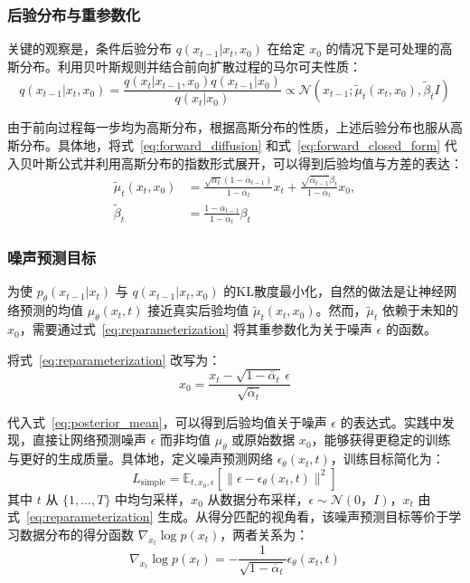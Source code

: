 \subsubsection{后验分布与重参数化}

关键的观察是，条件后验分布 $q(x_{t-1}|x_t,x_0)$ 在给定 $x_0$ 的情况下是可处理的高斯分布。利用贝叶斯规则并结合前向扩散过程的马尔可夫性质：
\begin{equation}\label{eq:posterior}
      q(x_{t-1}|x_t,x_0) = \frac{q(x_t|x_{t-1},x_0)q(x_{t-1}|x_0)}{q(x_t|x_0)} \propto \mathcal{N}(x_{t-1}; \tilde{\mu}_t(x_t,x_0), \tilde{\beta}_t I)
\end{equation}

由于前向过程每一步均为高斯分布，根据高斯分布的性质，上述后验分布也服从高斯分布。具体地，将式~\eqref{eq:forward_diffusion} 和式~\eqref{eq:forward_closed_form} 代入贝叶斯公式并利用高斯分布的指数形式展开，可以得到后验均值与方差的表达：
\begin{align}
      \tilde{\mu}_t(x_t,x_0) &= \frac{\sqrt{\alpha_t}(1-\overline{\alpha}_{t-1})}{1-\overline{\alpha}_t}x_t + \frac{\sqrt{\overline{\alpha}_{t-1}}\beta_t}{1-\overline{\alpha}_t}x_0, \label{eq:posterior_mean}\\
      \tilde{\beta}_t &= \frac{1-\overline{\alpha}_{t-1}}{1-\overline{\alpha}_t}\beta_t \label{eq:posterior_var}
\end{align}

\subsubsection{噪声预测目标}

为使 $p_\theta(x_{t-1}|x_t)$ 与 $q(x_{t-1}|x_t,x_0)$ 的KL散度最小化，自然的做法是让神经网络预测的均值 $\mu_\theta(x_t,t)$ 接近真实后验均值 $\tilde{\mu}_t(x_t,x_0)$。然而，$\tilde{\mu}_t$ 依赖于未知的 $x_0$，需要通过式~\eqref{eq:reparameterization} 将其重参数化为关于噪声 $\epsilon$ 的函数。

将式~\eqref{eq:reparameterization} 改写为：
\begin{equation}\label{eq:x0_from_xt}
      x_0 = \frac{x_t - \sqrt{1-\overline{\alpha}_t}\,\epsilon}{\sqrt{\overline{\alpha}_t}}
\end{equation}

代入式~\eqref{eq:posterior_mean}，可以得到后验均值关于噪声 $\epsilon$ 的表达式。实践中发现，直接让网络预测噪声 $\epsilon$ 而非均值 $\mu_\theta$ 或原始数据 $x_0$，能够获得更稳定的训练与更好的生成质量。具体地，定义噪声预测网络 $\epsilon_\theta(x_t,t)$，训练目标简化为：
\begin{equation}\label{eq:noise_loss}
      L_{\text{simple}} = \mathbb{E}_{t,x_0,\epsilon}\left[\|\epsilon - \epsilon_\theta(x_t,t)\|^2\right]
\end{equation}
其中 $t$ 从 $\{1,\ldots,T\}$ 中均匀采样，$x_0$ 从数据分布采样，$\epsilon\sim\mathcal{N}(0，I)$，$x_t$ 由式~\eqref{eq:reparameterization} 生成。从得分匹配的视角看，该噪声预测目标等价于学习数据分布的得分函数 $\nabla_{x_t}\log p(x_t)$，两者关系为：
\begin{equation}\label{eq:score_noise_relation}
      \nabla_{x_t}\log p(x_t) = -\frac{1}{\sqrt{1-\overline{\alpha}_t}}\epsilon_\theta(x_t,t)
\end{equation}

